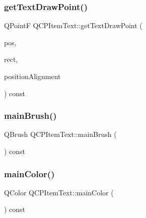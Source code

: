 \mbox{\label{class_q_c_p_item_text_a4c76ad7e33c50aff0a60b8f38fe6060e}} 
\subsubsection{\texorpdfstring{getTextDrawPoint()}{getTextDrawPoint()}}
{\footnotesize\ttfamily Q\+PointF Q\+C\+P\+Item\+Text\+::get\+Text\+Draw\+Point (\begin{DoxyParamCaption}\item[{const Q\+PointF \&}]{pos,  }\item[{const Q\+RectF \&}]{rect,  }\item[{Qt\+::\+Alignment}]{position\+Alignment }\end{DoxyParamCaption}) const\hspace{0.3cm}{\ttfamily [protected]}}

\mbox{\label{class_q_c_p_item_text_acddddd3ce88cfc87ab57b1ec4b25acb9}} 
\subsubsection{\texorpdfstring{mainBrush()}{mainBrush()}}
{\footnotesize\ttfamily Q\+Brush Q\+C\+P\+Item\+Text\+::main\+Brush (\begin{DoxyParamCaption}{ }\end{DoxyParamCaption}) const\hspace{0.3cm}{\ttfamily [protected]}}

\mbox{\label{class_q_c_p_item_text_abe3f10805baf62797cb91fd4a4464fcc}} 
\subsubsection{\texorpdfstring{mainColor()}{mainColor()}}
{\footnotesize\ttfamily Q\+Color Q\+C\+P\+Item\+Text\+::main\+Color (\begin{DoxyParamCaption}{ }\end{DoxyParamCaption}) const\hspace{0.3cm}{\ttfamily [protected]}}

